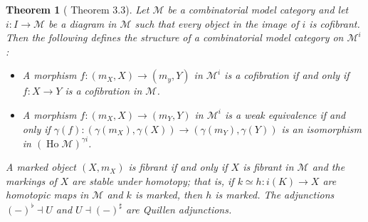 \documentclass[a4paper]{article}
\newtheorem{theorem}{Theorem}
\theoremstyle{remark}
\theoremstyle{definition}
\begin{document}
\begin{theorem}[\cite{marked-objects} Theorem 3.3]
  \label{th:marked-model-category}
  Let $\mathcal{M}$ be a combinatorial model category and let $i : I \rightarrow \mathcal{M}$ be a diagram in $\mathcal{M}$ such that every object in the image of $i$ is cofibrant.
  Then the following defines the structure of a combinatorial model category on $\mathcal{M}^i$:
  \begin{itemize}
    \item
      A morphism $f : (m_X, X) \rightarrow (m_y, Y)$ in $\mathcal{M}^i$ is a cofibration if and only if $f : X \rightarrow Y$ is a cofibration in $\mathcal{M}$.
    \item
      A morphism $f : (m_X, X) \rightarrow (m_Y, Y)$ in $\mathcal{M}^i$ is a weak equivalence if and only if $\gamma(f) : (\gamma(m_X), \gamma(X)) \rightarrow (\gamma(m_Y), \gamma(Y))$ is an isomorphism in $(\operatorname{Ho} \mathcal{M})^{\gamma i}$.
  \end{itemize}
  A marked object $(X, m_X)$ is fibrant if and only if $X$ is fibrant in $\mathcal{M}$ and the markings of $X$ are stable under homotopy; that is, if $k \simeq h : i(K) \rightarrow X$ are homotopic maps in $\mathcal{M}$ and $k$ is marked, then $h$ is marked.
  The adjunctions $(-)^\flat \dashv U$ and $U \dashv (-)^\sharp$ are Quillen adjunctions.
\end{theorem}
\end{document}
